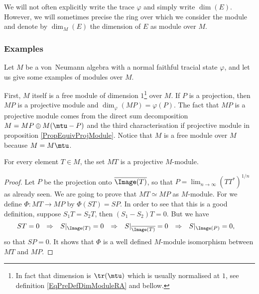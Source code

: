 We will not often explicitly write the trace $\varphi$ and simply write $\dim(E)$. However, we will sometimes precise the ring over which we consider the module and denote by $\dim_M(E)$ the dimension of $E$ as module over $M$.

					\subsubsection{Examples}		\label{subsubsecExemDimMMMod}

Let $M$ be a von~Neumann algebra with a normal faithful tracial state $\varphi$, and let us give some examples of modules over $M$.

First, $M$ itself is a free module of dimension $1$\footnote{In fact that dimension is $\tr(\mtu)$ which is usually normalised at $1$, see definition \eqref{EqPreDefDimModuleRA} and bellow.} over $M$. If $P$ is a projection, then $MP$ is a projective module\label{PgMPprojModule} and $\dim_{\varphi}(MP)=\varphi(P)$. The fact that $MP$ is a projective module comes from the direct sum decomposition $M=MP\oplus M(\mtu-P)$ and the third characterisation if projective module in proposition \ref{PropEquivProjModule}. Notice that $M$ is a free module over $M$ because $M=M\mtu$.

\begin{proposition}		\label{PropMTprojpourtoutT}
For every element $T\in M$, the set $MT$ is a projective $M$-module.
\end{proposition}

\begin{proof}
Let $P$ be the projection onto $\overline{ \Image(T) }$, so that $P=\lim_{n\to\infty}(TT^*)^{1/n}$ as already seen. We are going to prove that $MT\simeq MP$ as $M$-module. For we define $\Phi\colon MT\to MP$ by $\Phi(ST)=SP$. In order to see that this is a good definition, suppose $S_1T=S_2T$, then $(S_1-S_2)T=0$. But we have
\begin{align}
	ST&=0&\Rightarrow &&S|_{\Image(T)}&=0&\Rightarrow &&S|_{\overline{ \Image(T) }}&=0&\Rightarrow	&&S|_{\Image(P)}&=0,
\end{align}
so that $SP=0$. It shows that $\Phi$ is a well defined $M$-module isomorphism between $MT$ and $MP$.
\end{proof}

